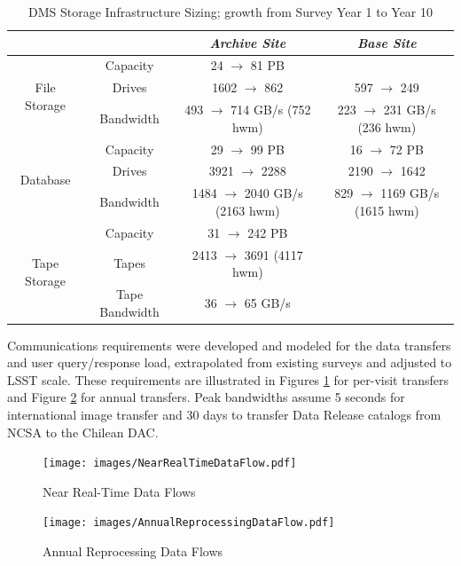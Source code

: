 \begin{table}
\centering
\begin{longtable}{|c|c|c|c|}
\hline
	& & \textit{Archive Site} & \textit{Base Site} \\ \hline
\multirow{3}{*}{File Storage} & Capacity & 24 $\rightarrow$ 81 PB & \\ \cline{2-4}
  & Drives & 1602 $\rightarrow$ 862 & 597 $\rightarrow$ 249 \\ \cline{2-4}
  & Bandwidth & 493 $\rightarrow$ 714 GB/s (752 hwm) & 223 $\rightarrow$ 231 GB/s (236 hwm) \\ \hline
\multirow{3}{*}{Database} & Capacity & 29 $\rightarrow$ 99 PB & 16 $\rightarrow$ 72 PB \\ \cline{2-4}
  & Drives & 3921 $\rightarrow$ 2288 & 2190 $\rightarrow$ 1642 \\ \cline{2-4}
  & Bandwidth & 1484 $\rightarrow$ 2040 GB/s (2163 hwm) & 829 $\rightarrow$ 1169 GB/s (1615 hwm) \\ \hline
\multirow{3}{*}{Tape Storage} & Capacity & 31 $\rightarrow$ 242 PB & \\ \cline{2-4}
  & Tapes & 2413 $\rightarrow$ 3691 (4117 hwm) & \\ \cline{2-4}
  & Tape Bandwidth & 36 $\rightarrow$ 65 GB/s & \\ \hline
\end{longtable}
\caption{DMS Storage Infrastructure Sizing; growth from Survey Year 1 to Year 10}
\label{table:storage-sizing}
\end{table}

Communications requirements were developed and modeled for the data transfers
and user query/response load, extrapolated from existing surveys and adjusted
to LSST scale.  These requirements are illustrated in Figures \ref{fig:near-real-time-flows} for per-visit transfers and Figure \ref{fig:annual-reprocessing-flows} for annual transfers.  Peak bandwidths assume 5 seconds for international
image transfer and 30 days to transfer Data Release catalogs from NCSA to the
Chilean DAC.

\begin{figure}
\centering
\texttt{[image: images/NearRealTimeDataFlow.pdf]}
\caption{Near Real-Time Data Flows}
\label{fig:near-real-time-flows}
\end{figure}

\begin{figure}
\centering
\texttt{[image: images/AnnualReprocessingDataFlow.pdf]}
\caption{Annual Reprocessing Data Flows}
\label{fig:annual-reprocessing-flows}
\end{figure}


